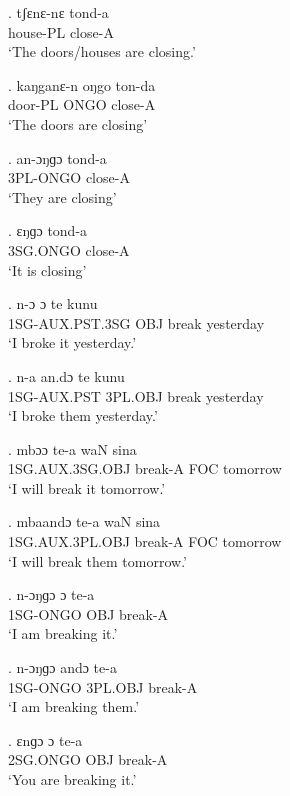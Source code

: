 \documentclass{assets/fieldnotes}
\begin{document}
\exg.
tʃɛnɛ-nɛ   tond-a  \\
house-PL   close-A \\%
`The doors/houses are closing.'

\exg.
kaŋganɛ-n oŋgo   ton-da  \\
door-PL     ONGO    close-A \\%
`The doors are closing'

\exg.
an-ɔŋɡɔ    tond-a  \\
3PL-ONGO   close-A \\%
`They are closing'

\exg.
ɛŋɡɔ       tond-a  \\
3SG.ONGO   close-A \\%
`It is closing'

\exg.
n-ɔ        ɔ     te      kunu      \\
1SG-AUX.PST.3SG   OBJ   break   yesterday \\%
`I broke it yesterday.' \label{I broke it yesterday}


\exg.
n-a    an.dɔ     te      kunu      \\
1SG-AUX.PST  3PL.OBJ   break   yesterday \\%
`I broke them yesterday.'

\exg.
mbɔɔ              te-a      waN   sina     \\
1SG.AUX.3SG.OBJ   break-A   FOC   tomorrow \\%
`I will break it tomorrow.'

\exg.
mbaandɔ           te-a      waN   sina     \\
1SG.AUX.3PL.OBJ   break-A   FOC   tomorrow \\%
`I will break them tomorrow.'

\exg.
n-ɔŋɡɔ     ɔ     te-a    \\
1SG-ONGO   OBJ   break-A \\%
`I am breaking it.'

\exg.
n-ɔŋɡɔ     andɔ      te-a    \\
1SG-ONGO   3PL.OBJ   break-A \\%
`I am breaking them.'

\exg.
ɛnɡɔ       ɔ     te-a    \\
2SG.ONGO   OBJ   break-A \\%
`You are breaking it.'
\end{document}
